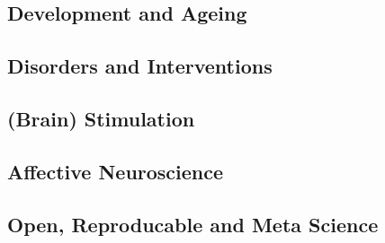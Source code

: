 \subsection*{Development and Ageing}

% 
% 
% 
% 
% 
% 
% 

\subsection*{Disorders and Interventions}

% 
% 
% 
% 
% 
% 
% 
% 
% 
% 
% 
% 
% 
% 
% 
% 
% 
% 

\subsection*{(Brain) Stimulation}

% 
% 
% 
% 
% 

\subsection*{Affective Neuroscience}

% 
% 
% 
% 
% 
% 
% 
% 
% 
% 
% 
% 

\subsection*{Open, Reproducable and Meta Science}

% 
% 
% 
% 
% 
\newpage